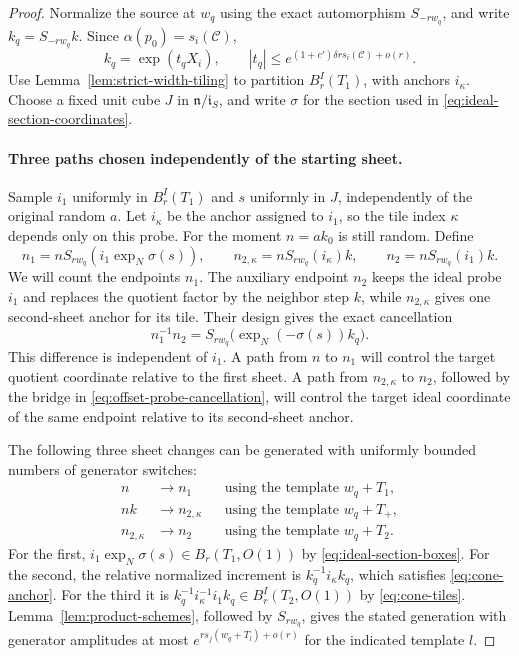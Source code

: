\begin{proof}
Normalize the source at $w_q$ using the exact automorphism $S_{-rw_q}$, and
write $k_q=S_{-rw_q}k$.  Since $\alpha(p_0)=s_i(\mathcal C)$,
\[
 k_q=\exp(t_qX_i),\qquad
 |t_q|\le e^{(1+c')\delta r s_i(\mathcal C)+o(r)}.
\]
Use Lemma~\ref{lem:strict-width-tiling} to partition $B^I_r(T_1)$, with
anchors $i_\kappa$.  Choose a fixed unit cube $J$ in
$\mathfrak n/\mathfrak i_S$, and write $\sigma$ for the section used in
\eqref{eq:ideal-section-coordinates}.

\paragraph{Three paths chosen independently of the starting sheet.}
Sample $i_1$ uniformly in $B^I_r(T_1)$ and $s$ uniformly in $J$,
independently of the original random $a$.  Let $i_\kappa$ be the anchor assigned
to $i_1$, so the tile index $\kappa$ depends only on this probe.
For the moment $n=ak_0$ is still random.  Define
\begin{equation}
 n_1=nS_{rw_q}(i_1\exp_N\sigma(s)),\qquad
 n_{2,\kappa}=nS_{rw_q}(i_\kappa)k,\qquad
 n_2=nS_{rw_q}(i_1)k.
 \label{eq:offset-probes}
\end{equation}
We will count the endpoints $n_1$.  The auxiliary endpoint $n_2$
keeps the ideal probe $i_1$ and replaces the quotient factor by the
neighbor step $k$, while $n_{2,\kappa}$ gives one second-sheet anchor
for its tile.  Their design gives the exact cancellation
\begin{equation}
 n_1^{-1}n_2=S_{rw_q}\bigl(\exp_N(-\sigma(s))k_q\bigr).
 \label{eq:offset-probe-cancellation}
\end{equation}
This difference is independent of $i_1$.  A path from $n$ to $n_1$
will control the target quotient coordinate relative to the first
sheet.  A path from $n_{2,\kappa}$ to $n_2$, followed by the bridge
in \eqref{eq:offset-probe-cancellation}, will control the target ideal
coordinate of the same endpoint relative to its second-sheet anchor.

The following three sheet changes can be generated with uniformly bounded
numbers of generator switches:
\begin{align*}
 n&\longrightarrow n_1
       &&\text{using the template }w_q+T_1,\\
 nk&\longrightarrow n_{2,\kappa}
       &&\text{using the template }w_q+T_+,\\
 n_{2,\kappa}&\longrightarrow n_2
       &&\text{using the template }w_q+T_2.
\end{align*}
For the first, $i_1\exp_N\sigma(s)\in B_r(T_1,O(1))$ by
\eqref{eq:ideal-section-boxes}.  For the second, the relative normalized
increment is $k_q^{-1}i_\kappa k_q$, which satisfies
\eqref{eq:cone-anchor}.  For the third it is
$k_q^{-1}i_\kappa^{-1}i_1k_q\in B^I_r(T_2,O(1))$ by
\eqref{eq:cone-tiles}.  Lemma~\ref{lem:product-schemes}, followed by
$S_{rw_q}$, gives the stated generation with generator amplitudes at most
$e^{rs_j(w_q+T_l)+o(r)}$ for the indicated template $l$.


\end{proof}
